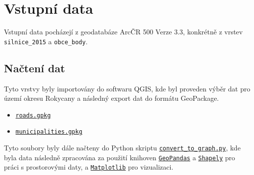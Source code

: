 \section{Vstupní data}
Vstupní data pocházejí z geodatabáze ArcČR 500 Verze 3.3, konkrétně z vrstev \texttt{silnice\_2015} a \texttt{obce\_body}.\cite{arcdataGeodatabaze}
\subsection{Načtení dat}
Tyto vrstvy byly importovány do softwaru QGIS, kde byl proveden výběr dat pro území okresu Rokycany a následný export dat do formátu GeoPackage.
\begin{itemize}
    \item \texttt{\href{https://github.com/kovarmi9/YGEI_sk3/blob/main/U3/data/roads.gpkg}{roads.gpkg}}
    \item \texttt{\href{https://github.com/kovarmi9/YGEI_sk3/blob/main/U3/data/municipalities.gpkg}{municipalities.gpkg}}
\end{itemize}
Tyto soubory byly dále načteny do Python skriptu \texttt{\href{https://github.com/kovarmi9/YGEI_sk3/blob/main/U3/convert_to_graph.py}{convert\_to\_graph.py}}, kde byla data následně zpracována za použití knihoven \texttt{\href{https://geopandas.org/}{GeoPandas}} a \texttt{\href{https://shapely.readthedocs.io/}{Shapely}} pro práci s prostorovými daty, a \texttt{\href{https://matplotlib.org/}{Matplotlib}} pro vizualizaci.


